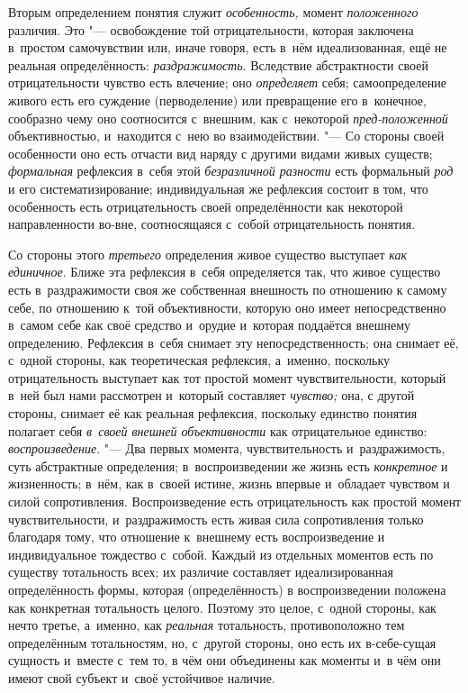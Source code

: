 Вторым определением понятия служит
{\em особенность,} момент
{\em положенного}
различия. Это "--- освобождение той
отрицательности, которая заключена в~простом самочувствии или, иначе
говоря, есть в~нём идеализованная, ещё не реальная определённость:
{\em раздражимость}.
Вследствие абстрактности своей отрицательности чувство есть
влечение; оно {\em определяет}
себя; самоопределение живого есть его суждение (перводеление)
или превращение его в~конечное, сообразно чему оно соотносится с~внешним,
как с~некоторой {\em пред-положенной}
объективностью, и~находится с~нею во взаимодействии. "---
Со стороны своей особенности оно есть отчасти вид наряду с
другими видами живых существ;
{\em формальная}
рефлексия в~себя этой
{\em безразличной разности}
есть формальный {\em род}
и его систематизирование; индивидуальная же рефлексия состоит
в том, что особенность есть отрицательность своей определённости как
некоторой направленности во-вне, соотносящаяся с~собой отрицательность
понятия.

Со стороны этого
{\em третьего}
определения живое существо выступает
{\em как единичное}.
Ближе эта рефлексия в~себя определяется так, что живое
существо есть в~раздражимости своя же собственная внешность по отношению к
самому себе, по отношению к~той объективности, которую оно имеет
непосредственно в~самом себе как своё средство и~орудие и~которая поддаётся
внешнему определению. Рефлексия в~себя снимает эту непосредственность; она
снимает её, с~одной стороны, как теоретическая рефлексия, а~именно,
поскольку отрицательность выступает как тот простой момент
чувствительности, который в~ней был нами рассмотрен и~который составляет
{\em чувство;} она, с
другой стороны, снимает её как реальная рефлексия, поскольку единство
понятия полагает себя {\em в~своей
внешней объективности} как отрицательное единство:
{\em воспроизведение}. "---
Два первых момента, чувствительность и~раздражимость, суть
абстрактные определения; в~воспроизведении же жизнь есть
{\em конкретное} и
жизненность; в~нём, как в~своей истине, жизнь впервые и~обладает чувством и
силой сопротивления. Воспроизведение есть отрицательность как простой
момент чувствительности, и~раздражимость есть живая сила сопротивления
только благодаря тому, что отношение к~внешнему есть воспроизведение и
индивидуальное тождество с~собой. Каждый из отдельных
моментов есть по существу тотальность всех; их различие составляет
идеализированная определённость формы, которая (определённость) в
воспроизведении положена как конкретная тотальность целого. Поэтому это
целое, с~одной стороны, как нечто третье, а~именно, как
{\em реальная}
тотальность, противоположно тем определённым тотальностям,
но, с~другой стороны, оно есть их в-себе-сущая сущность и~вместе с~тем то,
в чём они объединены как моменты и~в чём они имеют свой субъект и~своё
устойчивое наличие.

